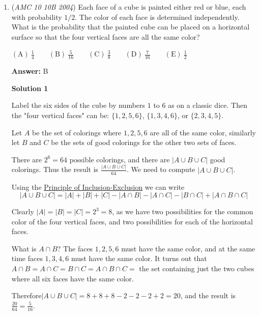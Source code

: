 \begin{enumerate}
 
            \begin{itemize}
        \item Someone please draw a diagram and try to make it cleaner to read.
            \end{itemize}
            


	\item (\textit{AMC 10 10B 2004}) Each face of a cube is painted either red or blue, each with probability $1/2$. The color of each face is determined independently. What is the probability that the painted cube can be placed on a horizontal surface so that the four vertical faces are all the same color?


 $\mathrm{(A) \ } \frac{1}{4} \qquad \mathrm{(B) \ } \frac{5}{16} \qquad \mathrm{(C) \ } \frac{3}{8} \qquad \mathrm{(D) \ } \frac{7}{16} \qquad \mathrm{(E) \ } \frac{1}{2}$

 \textbf{Answer: }B



\textbf{Solution 1}

Label the six sides of the cube by numbers $1$ to $6$ as on a classic dice. Then the "four vertical faces" can be: $\{1,2,5,6\}$, $\{1,3,4,6\}$, or $\{2,3,4,5\}$.

 Let $A$ be the set of colorings where $1,2,5,6$ are all of the same color, similarly let $B$ and $C$ be the sets of good colorings for the other two sets of faces.

 There are $2^6=64$ possible colorings, and there are $|A\cup B\cup C|$ good colorings. Thus the result is $\frac{|A\cup B\cup C|}{64}$. We need to compute $|A\cup B\cup C|$. 

 Using the \href{https://artofproblemsolving.com/wiki/index.php?title=Principle\_of\_Inclusion-Exclusion}{Principle of Inclusion-Exclusion} we can write
 \[|A\cup B\cup C| = |A|+|B|+|C| - |A\cap B| - |A\cap C| - |B\cap C| + |A\cap B\cap C|\]

 Clearly $|A|=|B|=|C|=2^3=8$, as we have two possibilities for the common color of the four vertical faces, and two possibilities for each of the horizontal faces.

 What is $A\cap B$? The faces $1,2,5,6$ must have the same color, and at the same time faces $1,3,4,6$ must have the same color. It turns out that $A\cap B=A\cap C=B\cap C= A\cap B\cap C =$ the set containing just the two cubes where all six faces have the same color.

 Therefore$|A\cup B\cup C| = 8+8+8-2-2-2+2 = 20$, and the result is $\frac{20}{64}=\boxed{\frac{5}{16}}$.


\end{enumerate}
